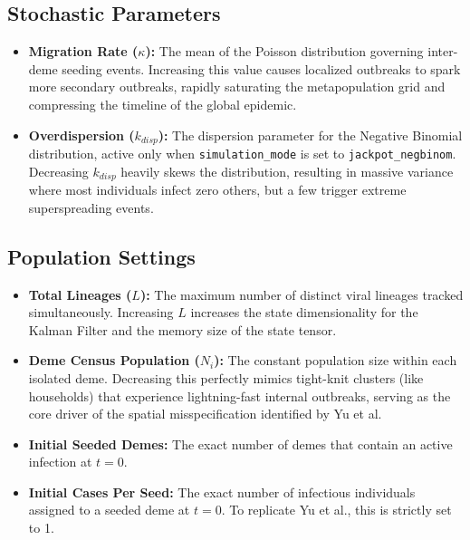 \documentclass[12pt]{article}
\begin{document}
\subsection{Stochastic Parameters}
\begin{itemize}
    \item \textbf{Migration Rate ($\kappa$):} The mean of the Poisson distribution governing inter-deme seeding events. Increasing this value causes localized outbreaks to spark more secondary outbreaks, rapidly saturating the metapopulation grid and compressing the timeline of the global epidemic.
    \item \textbf{Overdispersion ($k_{disp}$):} The dispersion parameter for the Negative Binomial distribution, active only when \texttt{simulation\_mode} is set to \texttt{jackpot\_negbinom}. Decreasing $k_{disp}$ heavily skews the distribution, resulting in massive variance where most individuals infect zero others, but a few trigger extreme superspreading events.
\end{itemize}

\subsection{Population Settings}
\begin{itemize}
    \item \textbf{Total Lineages ($L$):} The maximum number of distinct viral lineages tracked simultaneously. Increasing $L$ increases the state dimensionality for the Kalman Filter and the memory size of the state tensor.
    \item \textbf{Deme Census Population ($N_i$):} The constant population size within each isolated deme. Decreasing this perfectly mimics tight-knit clusters (like households) that experience lightning-fast internal outbreaks, serving as the core driver of the spatial misspecification identified by Yu et al.
    \item \textbf{Initial Seeded Demes:} The exact number of demes that contain an active infection at $t=0$. 
    \item \textbf{Initial Cases Per Seed:} The exact number of infectious individuals assigned to a seeded deme at $t=0$. To replicate Yu et al., this is strictly set to 1.
\end{itemize}
\end{document}
